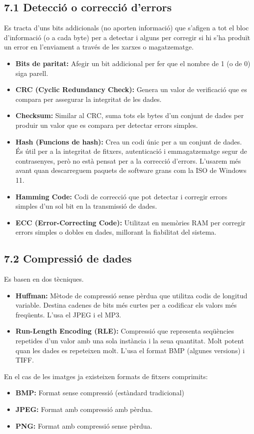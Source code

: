 \documentclass[
  12 pt,
  a4paper,
]{article}
\providecommand{\tightlist}{%
  \setlength{\itemsep}{0pt}\setlength{\parskip}{0pt}}
\begin{document}
\subsection{7.1 Detecció o correcció
d'errors}\label{detecciuxf3-o-correcciuxf3-derrors}

Es tracta d'uns bits addicionals (no aporten informació) que s'afigen a
tot el bloc d'informació (o a cada byte) per a detectar i alguns per
corregir si hi s'ha produït un error en l'enviament a través de les
xarxes o magatzematge.

\begin{itemize}
\item
  \textbf{Bits de paritat:} Afegir un bit addicional per fer que el
  nombre de 1 (o de 0) siga parell.
\item
  \textbf{CRC (Cyclic Redundancy Check):} Genera un valor de verificació
  que es compara per assegurar la integritat de les dades.
\item
  \textbf{Checksum:} Similar al CRC, suma tots els bytes d'un conjunt de
  dades per produir un valor que es compara per detectar errors simples.
\item
  \textbf{Hash (Funcions de hash):} Crea un codi únic per a un conjunt
  de dades. És útil per a la integritat de fitxers, autenticació i
  emmagatzematge segur de contrasenyes, però no està pensat per a la
  correcció d'errors. L'usarem més avant quan descarreguem paquets de
  software grans com la ISO de Windows 11.
\item
  \textbf{Hamming Code:} Codi de correcció que pot detectar i corregir
  errors simples d'un sol bit en la transmissió de dades.
\item
  \textbf{ECC (Error-Correcting Code):} Utilitzat en memòries RAM per
  corregir errors simples o dobles en dades, millorant la fiabilitat del
  sistema.
\end{itemize}

\subsection{7.2 Compressió de dades}\label{compressiuxf3-de-dades}

Es basen en dos tècniques.

\begin{itemize}
\item
  \textbf{Huffman:} Mètode de compressió sense pèrdua que utilitza codis
  de longitud variable. Destina cadenes de bits més curtes per a
  codificar els valors més freqüents. L'usa el JPEG i el MP3.
\item
  \textbf{Run-Length Encoding (RLE):} Compressió que representa
  seqüències repetides d'un valor amb una sola instància i la seua
  quantitat. Molt potent quan les dades es repeteixen molt. L'usa el
  format BMP (algunes versions) i TIFF.
\end{itemize}

En el cas de les imatges ja existeixen formats de fitxers comprimits:

\begin{itemize}
\tightlist
\item
  \textbf{BMP:} Format sense compressió (estàndard tradicional)
\item
  \textbf{JPEG:} Format amb compressió amb pèrdua.
\item
  \textbf{PNG:} Format amb compressió sense pèrdua.
\end{itemize}
\end{document}
